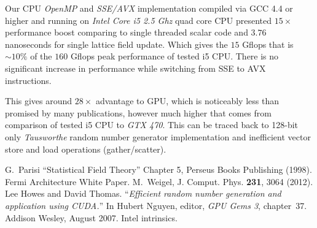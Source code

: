 \documentclass[a4paper]{llncs}
\begin{document}
Our CPU \emph{OpenMP} and \emph{SSE/AVX} implementation compiled via
GCC 4.4 or higher and running on \emph{Intel Core i5 2.5 Ghz} quad
core CPU presented $15\times$ performance boost comparing to single
threaded scalar code and $3.76$ nanoseconds for single lattice field
update.  Which gives the $15$ Gflops that is $\sim10\%$ of the  $160$
Gflops peak performance of tested i5 CPU. There is no significant
increase in performance while switching from SSE to AVX instructions.

This gives around $28\times$ advantage to GPU, which is noticeably
less than promised by many publications, however much higher that
comes from comparison of  tested i5
CPU to \emph{GTX 470}. This can be
traced back to 128-bit only \emph{Tausworthe} random number generator
implementation and inefficient vector store and load operations
(gather/scatter).

\begin{thebibliography}{9}
 G.~Parisi ``Statistical Field Theory'' Chapter 5, Perseus Books Publishing (1998).
 Fermi Architecture White Paper. 
 M.~Weigel, J. Comput. Phys. \textbf{231}, 3064 (2012).
Lee Howes and David Thomas.
``{\em Efficient random number generation and application using {CUDA}.}''
In Hubert Nguyen, editor, {\em GPU Gems 3}, chapter~37. Addison
  Wesley, August 2007.
 Intel intrinsics. 
\end{thebibliography}
\end{document}

